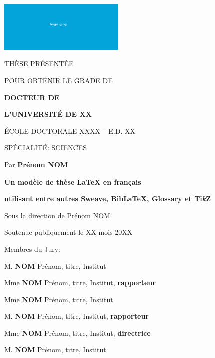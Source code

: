 \documentclass[paper=a4,fontsize=12pt,version=last,final]{scrbook}
\newenvironment{centertitlepage}
{\vspace*{\fill}\begin{center}}%
{\end{center}\vspace*{\fill}\par}%
\begin{document}
\begin{titlepage}

\noindent \includegraphics[width=0.45\textwidth,trim = 75mm 5mm 10mm 5mm, clip]{pictures/logo.png}

\begin{centertitlepage}

\MakeUppercase{Thèse présentée}

\vspace{0.35cm} 
\MakeUppercase{pour obtenir le grade de}

\vspace{0.65cm} 
{\large\bfseries \MakeUppercase{Docteur de}}

\vspace{0.35cm} 
{\large\bfseries \MakeUppercase{l'Université de XX}}

\vspace{0.65cm} 
\MakeUppercase{école doctorale XXXX -- E.D. XX}

\vspace{0.35cm} 
\MakeUppercase{Spécialité: Sciences}

\vspace{1.85cm} 
{\Large Par {\bfseries Prénom \MakeUppercase{Nom}}}

{\Large
\vspace{1.5cm} 
\textbf{Un modèle de thèse \LaTeX{} en français }

\vspace{0.2cm}\textbf{utilisant entre autres Sweave, Bib\LaTeX{}, Glossary et Ti\textit{k}Z}
}

\vspace{1.85cm} 
Sous la direction de Prénom \MakeUppercase{Nom}

\vspace{1.5cm} 
\noindent Soutenue publiquement le XX mois 20XX

\end{centertitlepage}

{\normalfont

\vspace{0.75cm} 
\noindent Membres du Jury:

\vspace{0.5cm}
\noindent M. \textbf{\MakeUppercase{Nom}} Prénom, titre, Institut \hfill 

\noindent Mme \textbf{\MakeUppercase{Nom}} Prénom, titre, Institut, \textbf{rapporteur}

\noindent Mme \textbf{\MakeUppercase{Nom}} Prénom, titre, Institut \hfill

\noindent M. \textbf{\MakeUppercase{Nom}} Prénom, titre, Institut, \textbf{rapporteur}

\noindent Mme \textbf{\MakeUppercase{Nom}} Prénom, titre, Institut, \textbf{directrice}

\noindent M. \textbf{\MakeUppercase{Nom}} Prénom, titre, Institut \hfill 

}

\end{titlepage}
\end{document}
